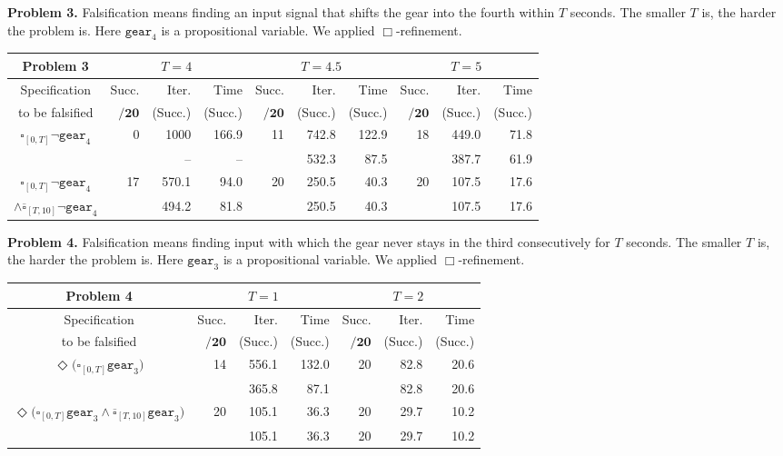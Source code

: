 \documentclass[envcountsect,orivec]{llncs} \usepackage{etex} \usepackage[]{graphicx}
\newcommand{\DiaOp}[1]{\Diamond_{#1}}
\newcommand{\BoxOp}[1]{\square_{#1}}
\newcommand{\TBoxOp}[1]{\overline{\square}_{#1}}
\newcommand{\Succ}{Succ.}
\begin{document}
\begin{table}[ptb]
  \vspace{1em}
  \begin{minipage}{\textwidth}
    \textbf{Problem 3.} Falsification means finding an input signal 
    that shifts the gear into the fourth within $T$ seconds. 
    The smaller $T$ is, the harder the problem is. Here $\mathtt{gear}_4$
    is a propositional variable.
We applied $\Box$-refinement.
  \end{minipage}
  \begin{tabular}{c||r|r|r|r|r|r|r|r|r}
    \textbf{Problem 3}
    &\multicolumn{3}{|c|}{$T = 4$} &\multicolumn{3}{|c|}{$T = 4.5$} &\multicolumn{3}{|c}{$T = 5$}\\ \hline
    Specification & \Succ & Iter. & Time & \Succ & Iter. & Time &
    \Succ & Iter. & Time \\
    to be falsified
    & $\mathbf{/20}$ & (\Succ) & (\Succ) &$\mathbf{/20}$ & (\Succ) & (\Succ)&$\mathbf{/20}$  & (\Succ) & (\Succ)\\  \hline\hline
    $\BoxOp{[0,T]}{\neg \mathtt{gear}_4}$ 
    & 0& 1000& 166.9& 11& 742.8 & 122.9& 18& 449.0 &  71.8 \\ 
    &  &    --&     --&   & 532.3 &  87.5&   & 387.7 &  61.9 \\ \hline
    $\BoxOp{[0,T]}{\neg \mathtt{gear}_4}$ 
    & 17& 570.1& 94.0& 20& 250.5& 40.3& 20& 107.5& 17.6\\
    $\wedge \TBoxOp{[T,10]}{\neg \mathtt{gear}_4}$
    &   & 494.2& 81.8&   & 250.5& 40.3&   & 107.5& 17.6\\
  \end{tabular}

  \vspace{1em}
  \begin{minipage}{\textwidth}
    \textbf{Problem 4.} Falsification means finding input  
    with which the gear never stays in the third consecutively for $T$ seconds.
The smaller $T$ is, the harder the problem is.
    Here $\mathtt{gear}_3$
    is a propositional variable.
    We applied $\Box$-refinement.
  \end{minipage}
  \begin{tabular}{c||r|r|r|r|r|r}
    \textbf{Problem 4}
    &\multicolumn{3}{|c|}{$T = 1$} &\multicolumn{3}{|c}{$T = 2$} \\ \hline
    Specification & \Succ & Iter. & Time & \Succ & Iter. & Time \\
    to be falsified
    & $\mathbf{/20}$ & (\Succ) & (\Succ) &$\mathbf{/20}$ & (\Succ) & (\Succ)\\  \hline\hline
    $\DiaOp{}\big(\BoxOp{[0, T]}\mathtt{gear}_3\big)$
    & 14& 556.1& 132.0& 20& 82.8& 20.6\\
    &   & 365.8&  87.1&   & 82.8& 20.6\\\hline
    $\DiaOp{}\big(\BoxOp{[0, T]}\mathtt{gear}_3 \wedge \TBoxOp{[T, 10]}\mathtt{gear}_3 \big)$
    & 20& 105.1&  36.3& 20& 29.7& 10.2\\
    &   & 105.1&  36.3& 20& 29.7& 10.2\\
  \end{tabular}


\end{table}
\end{document}
